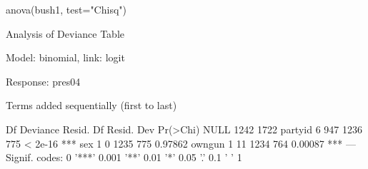 \begin{Schunk}
\begin{Sinput}
 anova(bush1, test="Chisq")
\end{Sinput}
\begin{Soutput}
Analysis of Deviance Table

Model: binomial, link: logit

Response: pres04

Terms added sequentially (first to last)


        Df Deviance Resid. Df Resid. Dev Pr(>Chi)    
NULL                     1242       1722             
partyid  6      947      1236        775  < 2e-16 ***
sex      1        0      1235        775  0.97862    
owngun   1       11      1234        764  0.00087 ***
---
Signif. codes:  0 '***' 0.001 '**' 0.01 '*' 0.05 '.' 0.1 ' ' 1 
\end{Soutput}
\end{Schunk}
